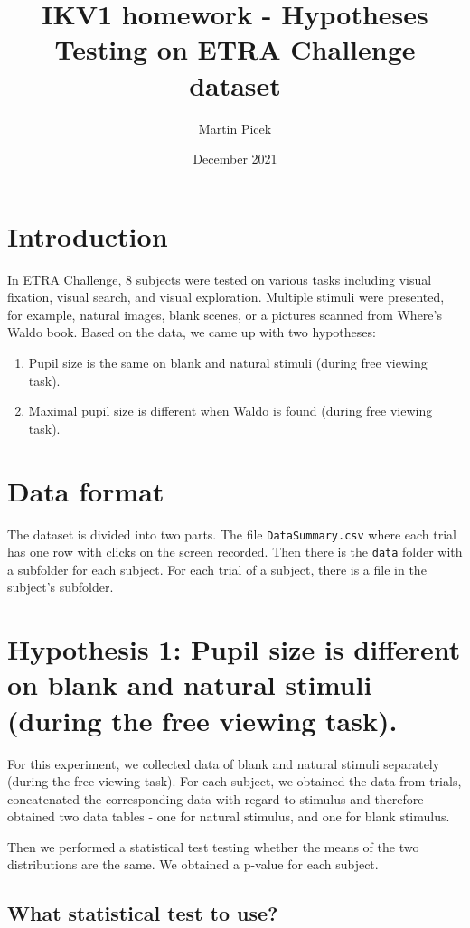 \documentclass[a4paper]{article}
\title{ IKV1 homework - Hypotheses Testing on ETRA Challenge dataset }
\author{Martin Picek }
\date{December 2021}
\begin{document}
\maketitle

\section{Introduction}

In ETRA Challenge, 8 subjects were tested on various tasks including visual fixation, visual search, and visual exploration. Multiple stimuli were presented, for example,
natural images, blank scenes, or a pictures scanned from Where's Waldo book. Based on the data, we came up with two hypotheses:
\begin{enumerate}
    \item Pupil size is the same on blank and natural stimuli (during free viewing task).
    \item Maximal pupil size is different when Waldo is found (during free viewing task).
\end{enumerate}

\section{Data format}

The dataset is divided into two parts. The file \texttt{DataSummary.csv} where each trial has one row with clicks on the screen recorded. Then there is the \texttt{data} folder with a subfolder
for each subject. For each trial of a subject, there is a file in the subject's subfolder.

\section{Hypothesis 1: Pupil size is different on blank and natural stimuli (during the free viewing task).}

For this experiment, we collected data of blank and natural stimuli separately (during the free viewing task). For each subject, we obtained the data from trials,
concatenated the corresponding data with regard to stimulus and therefore obtained two data tables - one for natural stimulus, and one for blank stimulus.

Then we performed a statistical test testing whether the means of the two distributions are the same. We obtained a p-value for each subject.

\subsection{What statistical test to use?}
\end{document}
